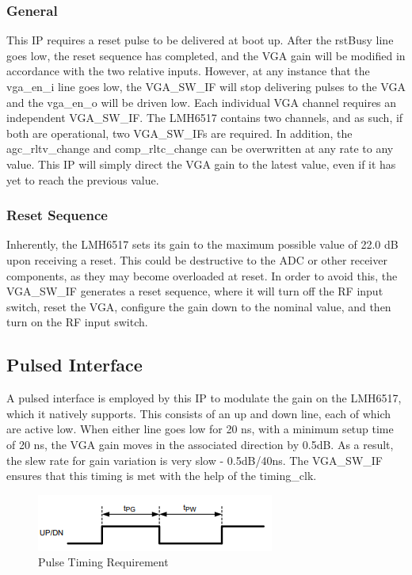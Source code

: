 \documentclass[11pt]{article}
\begin{document}
\subsubsection{General}
This IP requires a reset pulse to be delivered at boot up. After the rstBusy line goes low, the reset sequence has completed, and the VGA gain will be 
modified in accordance with the two relative inputs. However, at any instance that the vga\_en\_i line goes low, the VGA\_SW\_IF will stop delivering
pulses to the VGA and the vga\_en\_o will be driven low.\hfill\break
Each individual VGA channel requires an independent VGA\_SW\_IF. The LMH6517 contains two channels, and as such, if both are operational, two VGA\_SW\_IFs
are required.\hfill\break
In addition, the agc\_rltv\_change and comp\_rltc\_change can be overwritten at any rate to any value. This IP will simply direct the VGA gain to the
latest value, even if it has yet to reach the previous value.
\subsubsection{Reset Sequence}
Inherently, the LMH6517 sets its gain to the maximum possible value of 22.0 dB upon receiving a reset. This could be destructive to the ADC or other
receiver components, as they may become overloaded at reset. In order to avoid this, the VGA\_SW\_IF generates a reset sequence, where it will turn off
the RF input switch, reset the VGA, configure the gain down to the nominal value, and then turn on the RF input switch.
\subsection{Pulsed Interface} 
A pulsed interface is employed by this IP to modulate the gain on the LMH6517, which it natively supports. This consists of an up and down line, each of 
which are active low. When either line goes low for 20 ns, with a minimum setup time of 20 ns, the VGA gain moves in the associated direction by 0.5dB.
As a result, the slew rate for gain variation is very slow - 0.5dB/40ns.\hfill\break
The VGA\_SW\_IF ensures that this timing is met with the help of the timing\_clk.
\begin{figure}[H]
	\centering
	\includegraphics[width=0.4\linewidth]{images/vga_pulse_timing}
	\caption{Pulse Timing Requirement}
\end{figure}
\end{document}

